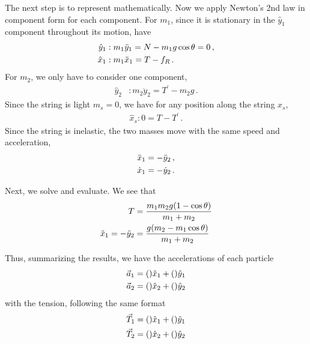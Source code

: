 \begin{subquestions}
The next step is to represent mathematically.
Now we apply Newton's 2nd law in component form for each component.
For $m_1$, since it is stationary in the $\hat{y}_1$ component throughout
its motion, have
\begin{align}
   \hat{y}_1 &: m_1 \ddot{y}_1 = N - m_1 g \cos\theta = 0  \,,\nonumber \\
   \hat{x}_1 &:m_1 \ddot{x}_1 = T - f_R \,.
\end{align}
For $m_2$, we only have to consider one component,
\begin{align}
   \hat{y}_2 &: m_2 \ddot{y}_2 = T^\prime - m_2g \,.
\end{align}
Since the string is light $m_s=0$, we have for any position along the string $x_s$,
\begin{align}
   \hat{x}_s: 0 = T - T^\prime \,.
\end{align}
Since the string is inelastic, the two masses move with the same speed and acceleration,
\begin{align}
   \ddot{x}_1 &= -\ddot{y}_2 \nonumber  \, ,\\
   \dot{x}_1 &= -\dot{y}_2  \, . 
\end{align}

Next, we solve and evaluate. We see that
\begin{align}
   T &= \frac{m_1m_2g(1 - \cos\theta)}{m_1 + m_2} \nonumber \\
   \ddot{x}_1 = - \ddot{y}_2 &= \frac{g(m_2 - m_1\cos\theta)}{m_1+m_2}
\end{align}

Thus, summarizing the results, we have the accelerations of each particle
\begin{align}
   \vec{a}_1 &=  () \hat{x}_1 + () \hat{y}_1 \nonumber \\
   \vec{a}_2 &=  () \hat{x}_2 + () \hat{y}_2  
\end{align}
with the tension, following the same format
\begin{align}
   \vec{T}_1 &= () \hat{x}_1 + () \hat{y}_1 \nonumber \\
   \vec{T}_2 &= () \hat{x}_2 + () \hat{y}_2 
\end{align}

\item




\end{subquestions}
